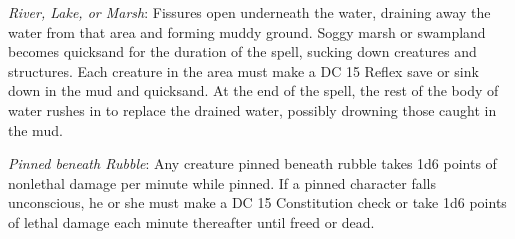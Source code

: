 {	\textit{River, Lake, or Marsh}:
	Fissures open underneath the water, draining away the water from that area and forming muddy ground. Soggy marsh or swampland becomes quicksand for the duration of the spell, sucking down creatures and structures. Each creature in the area must make a DC 15 Reflex save or sink down in the mud and quicksand. At the end of the spell, the rest of the body of water rushes in to replace the drained water, possibly drowning those caught in the mud.

	\textit{Pinned beneath Rubble}:
	Any creature pinned beneath rubble takes 1d6 points of nonlethal damage per minute while pinned. If a pinned character falls unconscious, he or she must make a DC 15 Constitution check or take 1d6 points of lethal damage each minute thereafter until freed or dead.

}
